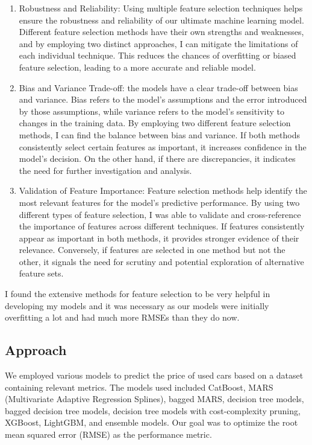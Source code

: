\documentclass[
  letterpaper,
  DIV=11,
  numbers=noendperiod]{scrartcl}
\begin{document}
\begin{enumerate}
\def\labelenumi{\arabic{enumi}.}
\item
  Robustness and Reliability: Using multiple feature selection
  techniques helps ensure the robustness and reliability of our ultimate
  machine learning model. Different feature selection methods have their
  own strengths and weaknesses, and by employing two distinct
  approaches, I can mitigate the limitations of each individual
  technique. This reduces the chances of overfitting or biased feature
  selection, leading to a more accurate and reliable model.
\item
  Bias and Variance Trade-off: the models have a clear trade-off between
  bias and variance. Bias refers to the model's assumptions and the
  error introduced by those assumptions, while variance refers to the
  model's sensitivity to changes in the training data. By employing two
  different feature selection methods, I can find the balance between
  bias and variance. If both methods consistently select certain
  features as important, it increases confidence in the model's
  decision. On the other hand, if there are discrepancies, it indicates
  the need for further investigation and analysis.
\item
  Validation of Feature Importance: Feature selection methods help
  identify the most relevant features for the model's predictive
  performance. By using two different types of feature selection, I was
  able to validate and cross-reference the importance of features across
  different techniques. If features consistently appear as important in
  both methods, it provides stronger evidence of their relevance.
  Conversely, if features are selected in one method but not the other,
  it signals the need for scrutiny and potential exploration of
  alternative feature sets.
\end{enumerate}

I found the extensive methods for feature selection to be very helpful
in developing my models and it was necessary as our models were
initially overfitting a lot and had much more RMSEs than they do now.

\hypertarget{approach}{%
\subsection{Approach}\label{approach}}

We employed various models to predict the price of used cars based on a
dataset containing relevant metrics. The models used included CatBoost,
MARS (Multivariate Adaptive Regression Splines), bagged MARS, decision
tree models, bagged decision tree models, decision tree models with
cost-complexity pruning, XGBoost, LightGBM, and ensemble models. Our
goal was to optimize the root mean squared error (RMSE) as the
performance metric.
\end{document}
